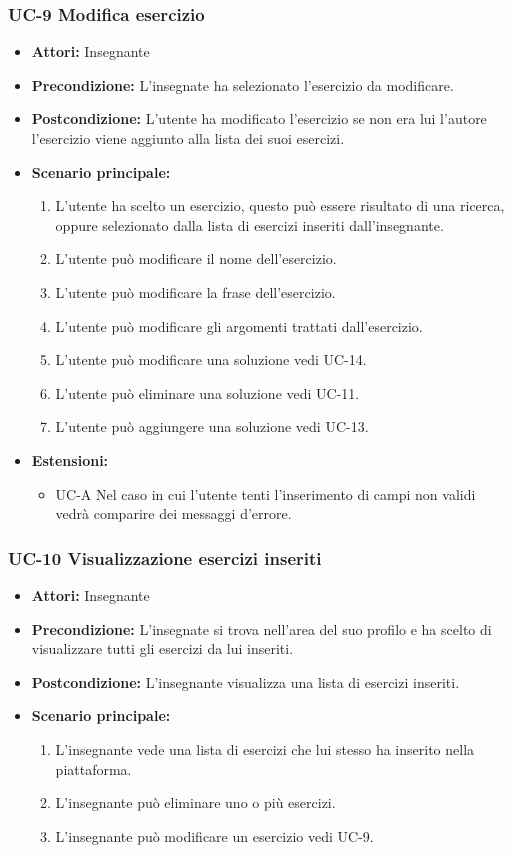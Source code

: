 \subsubsection{UC-9 Modifica esercizio}
\begin{itemize}
		\item \textbf{Attori: }Insegnante
		\item \textbf{Precondizione: }L'insegnate ha selezionato l'esercizio da modificare.
		\item \textbf{Postcondizione: }L'utente ha modificato l'esercizio se non era lui l'autore l'esercizio viene aggiunto alla lista dei suoi esercizi. 
		\item \textbf{Scenario principale: }
		\begin{enumerate}
		\item L'utente ha scelto un esercizio, questo può essere risultato di una ricerca, oppure selezionato dalla lista di esercizi inseriti dall'insegnante. 
		\item L'utente può modificare il nome dell'esercizio. 
		\item L'utente può modificare la frase dell'esercizio. 
		\item L'utente può modificare gli argomenti trattati dall'esercizio.
		\item L'utente può modificare una soluzione vedi UC-14.
		\item L'utente può eliminare una soluzione vedi UC-11.
		\item L'utente può aggiungere una soluzione vedi UC-13.
		\end{enumerate}
		\item \textbf{Estensioni: }
		\begin{itemize}
			\item UC-A Nel caso in cui l'utente tenti l'inserimento di campi non validi vedrà comparire dei messaggi d'errore.
		\end{itemize}
	\end{itemize}
\subsubsection{UC-10 Visualizzazione esercizi inseriti}
\begin{itemize}
\item \textbf{Attori: }Insegnante
		\item \textbf{Precondizione: }L'insegnate si trova nell'area del suo profilo e ha scelto di visualizzare tutti gli esercizi da lui inseriti.
		\item \textbf{Postcondizione: }L'insegnante visualizza una lista di esercizi inseriti. 
		\item \textbf{Scenario principale: }
		\begin{enumerate}
		\item L'insegnante vede una lista di esercizi che lui stesso ha inserito nella piattaforma.
		\item L'insegnante può eliminare uno o più esercizi.
		\item L'insegnante può modificare un esercizio vedi UC-9.
		\end{enumerate}
	\end{itemize}
